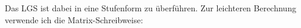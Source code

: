 Das LGS ist dabei in eine Stufenform zu überführen. Zur leichteren Berechnung verwende ich die Matrix-Schreibweise:





